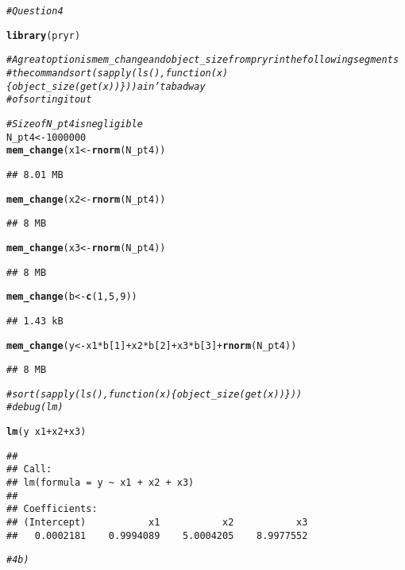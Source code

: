 \documentclass{article}\usepackage[]{graphicx}\usepackage[]{color}
\makeatletter
\newcommand{\hlnum}[1]{\textcolor[rgb]{0.686,0.059,0.569}{#1}}%
\newcommand{\hlcom}[1]{\textcolor[rgb]{0.678,0.584,0.686}{\textit{#1}}}%
\newcommand{\hlopt}[1]{\textcolor[rgb]{0,0,0}{#1}}%
\newcommand{\hlstd}[1]{\textcolor[rgb]{0.345,0.345,0.345}{#1}}%
\newcommand{\hlkwb}[1]{\textcolor[rgb]{0.69,0.353,0.396}{#1}}%
\newcommand{\hlkwd}[1]{\textcolor[rgb]{0.737,0.353,0.396}{\textbf{#1}}}%
\newenvironment{kframe}{%
 \def\at@end@of@kframe{}%
 \ifinner\ifhmode%
  \def\at@end@of@kframe{\end{minipage}}%
  \begin{minipage}{\columnwidth}%
 \fi\fi%
 \def\FrameCommand##1{\hskip\@totalleftmargin \hskip-\fboxsep
 \colorbox{shadecolor}{##1}\hskip-\fboxsep
     \hskip-\linewidth \hskip-\@totalleftmargin \hskip\columnwidth}%
 \MakeFramed {\advance\hsize-\width
   \@totalleftmargin\z@ \linewidth\hsize
   \@setminipage}}%
 {\par\unskip\endMakeFramed%
 \at@end@of@kframe}
\newenvironment{knitrout}{}{} %
\makeatother
\begin{document}
\begin{knitrout}
\color{fgcolor}\begin{kframe}
\begin{alltt}
\hlcom{# Question 4}

\hlkwd{library}\hlstd{(pryr)}

\hlcom{# A great option is mem_change and object_size from pryr in the following segments}
\hlcom{# the command sort(sapply(ls(),function(x)\{object_size(get(x))\})) ain't a bad way}
\hlcom{# of sorting it out}

\hlcom{# Size of N_pt4 is negligible}
\hlstd{N_pt4} \hlkwb{<-} \hlnum{1000000}
\hlkwd{mem_change}\hlstd{(x1} \hlkwb{<-} \hlkwd{rnorm}\hlstd{(N_pt4))}
\end{alltt}
\begin{verbatim}
## 8.01 MB
\end{verbatim}
\begin{alltt}
\hlkwd{mem_change}\hlstd{(x2} \hlkwb{<-} \hlkwd{rnorm}\hlstd{(N_pt4))}
\end{alltt}
\begin{verbatim}
## 8 MB
\end{verbatim}
\begin{alltt}
\hlkwd{mem_change}\hlstd{(x3} \hlkwb{<-} \hlkwd{rnorm}\hlstd{(N_pt4))}
\end{alltt}
\begin{verbatim}
## 8 MB
\end{verbatim}
\begin{alltt}
\hlkwd{mem_change}\hlstd{(b} \hlkwb{<-} \hlkwd{c}\hlstd{(}\hlnum{1}\hlstd{,}\hlnum{5}\hlstd{,}\hlnum{9}\hlstd{))}
\end{alltt}
\begin{verbatim}
## 1.43 kB
\end{verbatim}
\begin{alltt}
\hlkwd{mem_change}\hlstd{(y} \hlkwb{<-} \hlstd{x1}\hlopt{*}\hlstd{b[}\hlnum{1}\hlstd{]} \hlopt{+} \hlstd{x2}\hlopt{*}\hlstd{b[}\hlnum{2}\hlstd{]} \hlopt{+} \hlstd{x3}\hlopt{*}\hlstd{b[}\hlnum{3}\hlstd{]} \hlopt{+} \hlkwd{rnorm}\hlstd{(N_pt4))}
\end{alltt}
\begin{verbatim}
## 8 MB
\end{verbatim}
\begin{alltt}
\hlcom{# sort(sapply(ls(),function(x)\{object_size(get(x))\}))}
\hlcom{# debug(lm)}

\hlkwd{lm}\hlstd{(y} \hlopt{~} \hlstd{x1} \hlopt{+} \hlstd{x2} \hlopt{+} \hlstd{x3)}
\end{alltt}
\begin{verbatim}
## 
## Call:
## lm(formula = y ~ x1 + x2 + x3)
## 
## Coefficients:
## (Intercept)           x1           x2           x3  
##   0.0002181    0.9994089    5.0004205    8.9977552
\end{verbatim}
\begin{alltt}
\hlcom{# 4b)}


\end{alltt}
\end{kframe}
\end{knitrout}
\end{document}
